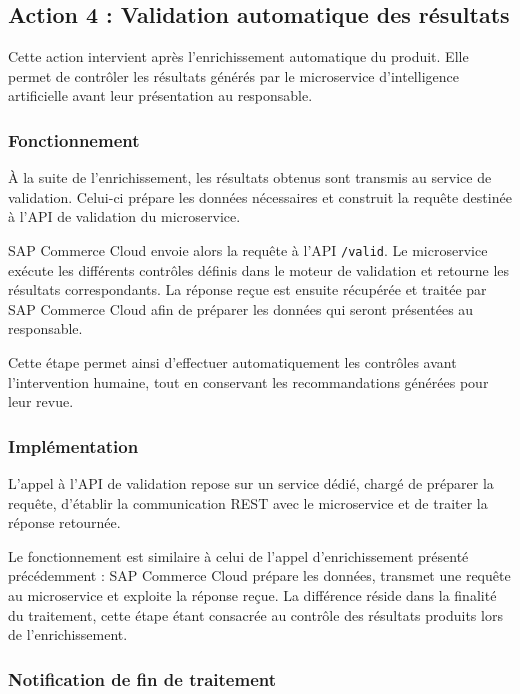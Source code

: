 \subsection{Action 4 : Validation automatique des résultats}

Cette action intervient après l'enrichissement automatique du produit. Elle permet de contrôler les résultats générés par le microservice d'intelligence artificielle avant leur présentation au responsable.

\subsubsection{Fonctionnement}

À la suite de l'enrichissement, les résultats obtenus sont transmis au service de validation. Celui-ci prépare les données nécessaires et construit la requête destinée à l'API de validation du microservice.

SAP Commerce Cloud envoie alors la requête à l'API \texttt{/valid}. Le microservice exécute les différents contrôles définis dans le moteur de validation et retourne les résultats correspondants. La réponse reçue est ensuite récupérée et traitée par SAP Commerce Cloud afin de préparer les données qui seront présentées au responsable.

Cette étape permet ainsi d'effectuer automatiquement les contrôles avant l'intervention humaine, tout en conservant les recommandations générées pour leur revue.

\subsubsection{Implémentation}

L'appel à l'API de validation repose sur un service dédié, chargé de préparer la requête, d'établir la communication REST avec le microservice et de traiter la réponse retournée.

Le fonctionnement est similaire à celui de l'appel d'enrichissement présenté précédemment : SAP Commerce Cloud prépare les données, transmet une requête au microservice et exploite la réponse reçue. La différence réside dans la finalité du traitement, cette étape étant consacrée au contrôle des résultats produits lors de l'enrichissement.

\subsubsection{Notification de fin de traitement}

